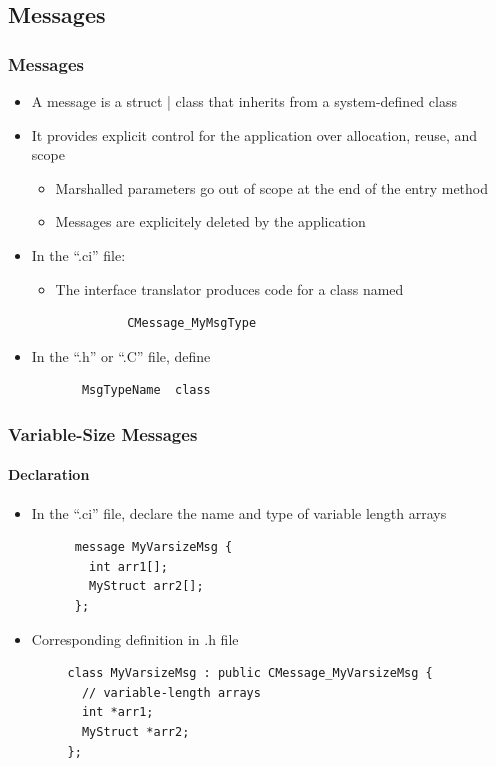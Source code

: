 \subsection[Messages]{Messages}

\begin{frame}[fragile]
  \frametitle{Messages}
  \begin{itemize}
    \item A message is a struct | class that inherits from a system-defined class
    \item It provides explicit control for the application over allocation, reuse, and scope
    \begin{itemize}
      \item Marshalled parameters go out of scope at the end of the entry method
      \item Messages are explicitely deleted by the application
    \end{itemize}
    \item In the ``.ci'' file:
      \begin{itemize}
         \begin{lstlisting}
          message MyMsgType;
         \end{lstlisting}
         \item The interface translator produces code for a class named
         \begin{lstlisting}
          CMessage_MyMsgType
         \end{lstlisting}
      \end{itemize} 
      \item In the “.h” or “.C” file, define
      \begin{lstlisting}
       MsgTypeName  class
      \end{lstlisting}
  \end{itemize}
\end{frame}

\begin{frame}[fragile]
  \frametitle{Variable-Size Messages}
  \framesubtitle{Declaration}
  \begin{itemize}
    \item In the “.ci” file, declare the name and type of variable length arrays
    \begin{lstlisting}
      message MyVarsizeMsg {
        int arr1[];
        MyStruct arr2[];
      };
    \end{lstlisting}
    \item Corresponding definition in .h file
    \begin{lstlisting}
     class MyVarsizeMsg : public CMessage_MyVarsizeMsg {
       // variable-length arrays
       int *arr1;
       MyStruct *arr2;
     };
    \end{lstlisting}
  \end{itemize}
\end{frame}

